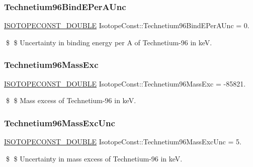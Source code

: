 \subsubsection{\texorpdfstring{Technetium96\+Bind\+E\+Per\+A\+Unc}{Technetium96BindEPerAUnc}}
{\footnotesize\ttfamily \mbox{\hyperlink{group___isotope_const-_macros_ga8f45a7272ce02c0b4c65c44636ed719a}{I\+S\+O\+T\+O\+P\+E\+C\+O\+N\+S\+T\+\_\+\+D\+O\+U\+B\+LE}} Isotope\+Const\+::\+Technetium96\+Bind\+E\+Per\+A\+Unc = 0.}

\$ \$ Uncertainty in binding energy per A of Technetium-\/96 in keV. \mbox{\label{group___isotope_const-_technetium-_tc96_gacb282d17bfe53c77fb6c71f65e4ed744}} 
\subsubsection{\texorpdfstring{Technetium96\+Mass\+Exc}{Technetium96MassExc}}
{\footnotesize\ttfamily \mbox{\hyperlink{group___isotope_const-_macros_ga8f45a7272ce02c0b4c65c44636ed719a}{I\+S\+O\+T\+O\+P\+E\+C\+O\+N\+S\+T\+\_\+\+D\+O\+U\+B\+LE}} Isotope\+Const\+::\+Technetium96\+Mass\+Exc = -\/85821.}

\$ \$ Mass excess of Technetium-\/96 in keV. \mbox{\label{group___isotope_const-_technetium-_tc96_ga4355c037628f3b7fd809d184e5000126}} 
\subsubsection{\texorpdfstring{Technetium96\+Mass\+Exc\+Unc}{Technetium96MassExcUnc}}
{\footnotesize\ttfamily \mbox{\hyperlink{group___isotope_const-_macros_ga8f45a7272ce02c0b4c65c44636ed719a}{I\+S\+O\+T\+O\+P\+E\+C\+O\+N\+S\+T\+\_\+\+D\+O\+U\+B\+LE}} Isotope\+Const\+::\+Technetium96\+Mass\+Exc\+Unc = 5.}

\$ \$ Uncertainty in mass excess of Technetium-\/96 in keV. \mbox{\label{group___isotope_const-_technetium-_tc96_gadc1b93929ae1f595a6824f180e28d2cc}} 
